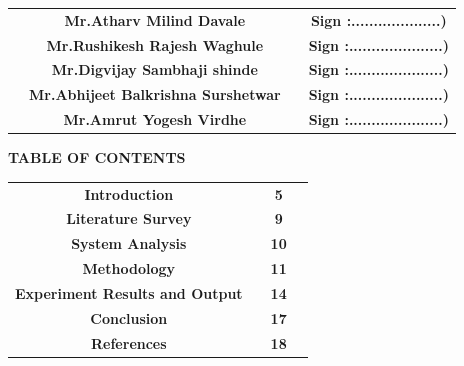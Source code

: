 \documentclass[12pt]{article}
\begin{document}
   
 \begin{tabular}{ c c c c } 
  \hspace{0.4in}&\textbf{Mr.Atharv Milind Davale} & \hspace{0.5in}  & \textbf{ Sign :....................)} \\ [1mm] 
  \hspace{0.4in} &\textbf {Mr.Rushikesh Rajesh Waghule}& \hspace{0.5in}   & \textbf{Sign :.....................) }\\[1mm]
  \hspace{0.4in}  &\textbf{ Mr.Digvijay Sambhaji shinde } & \hspace{0.5in}  & \textbf{Sign :.....................) }\\[1mm]
  \hspace{0.4in}  &\textbf{ Mr.Abhijeet Balkrishna Surshetwar} & \hspace{0.5in}  & \textbf{Sign :.....................) }\\[1mm]
  \hspace{0.4in}  &\textbf{ Mr.Amrut Yogesh Virdhe } & \hspace{0.5in}  & \textbf{Sign :.....................) }\\[7mm]
 \end{tabular}   


\clearpage


\begin{center}
 \Large \textbf {TABLE OF CONTENTS }\\[15mm]
 \end{center}


\begin{tabular}{ c c c c } 
  
\textbf{Introduction} & \hspace{2.5in}  & \textbf{5} \\ [5mm]  
  \textbf{Literature Survey} & \hspace{2.5in}  & \textbf{9} \\ [5mm]
  \textbf{System Analysis} & \hspace{2.5in}  & \textbf{10} \\ [5mm] 
  \textbf{Methodology} & \hspace{2.5in}  & \textbf{11} \\ [5mm] 
  \textbf{Experiment Results and Output} & \hspace{2.5in}  & \textbf{14} \\ [5mm] 
  \textbf{Conclusion} & \hspace{2.5in}  & \textbf{17} \\ [5mm] 
  \textbf{References} & \hspace{2.5in}  & \textbf{18} \\ [5mm]  
 \end{tabular}  
\end{document}

